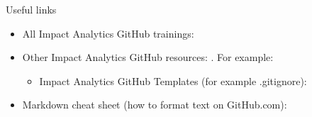 \begin{frame}{Useful links}
	\begin{itemize}
	  \item All Impact Analytics GitHub trainings: 
	  \item Other Impact Analytics GitHub resources: . For example:
		\begin{itemize}
			\item Impact Analytics GitHub Templates (for example .gitignore): 
		\end{itemize}
		\item Markdown cheat sheet (how to format text on GitHub.com):  
	\end{itemize}
\end{frame}
